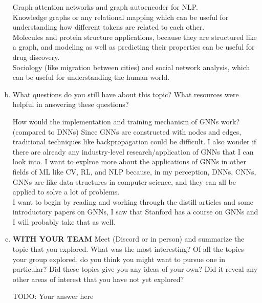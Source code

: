\documentclass[letterpaper,11pt]{article}
\begin{document}
\begin{enumerate}[a)]
\begin{tcolorbox}
    Graph attention networks and graph autoencoder for NLP.\\
    Knowledge graphs or any relational mapping which can be useful for understanding how different tokens
    are related to each other.\\
    Molecules and protein structure applications, because they are structured like a graph, and modeling
    as well as predicting their properties can be useful for drug discovery.\\
    Sociology (like migration between cities) and social network analysis,
    which can be useful for understanding the human world.
\end{tcolorbox}

\pagebreak
\item What questions do you still have about this topic? What resources were helpful in answering these questions?

\begin{tcolorbox}
    How would the implementation and training mechanism of GNNs work? (compared to DNNs) Since GNNs are
    constructed with nodes and edges, traditional techniques like backpropagation could be difficult.
    I also wonder if there are already any industry-level research/application of GNNs that I can look into.
    I want to explroe more about the applications of GNNs in other fields of ML like CV, RL, and NLP because,
    in my perception, DNNs, CNNs, GNNs are like data structures in computer science, and they can all be
    applied to solve a lot of problems.\\
    I want to begin by reading and working through the distill articles and some introductory papers on GNNs,
    I saw that Stanford has a course on GNNs and I will probably take that as well.
\end{tcolorbox}

\item \textbf{WITH YOUR TEAM} Meet (Discord or in person) and summarize the topic that you explored. What was the most interesting? Of all the topics your group explored, do you think you might want to pursue one in particular? Did these topics give you any ideas of your own? Did it reveal any other areas of interest that you have not yet explored?

\begin{tcolorbox}
TODO: Your answer here
\newline
\newline
\newline
\newline
\newline
\end{tcolorbox}

\end{enumerate}
\end{document}
